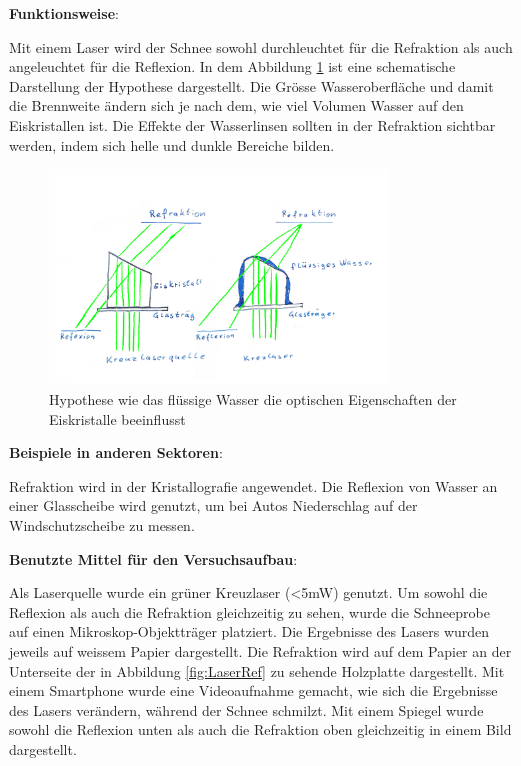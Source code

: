 

\textbf{Funktionsweise}:

Mit einem Laser wird der Schnee sowohl durchleuchtet für die Refraktion als auch angeleuchtet für die Reflexion. In dem Abbildung \ref{fig:LaserHypothese} ist eine schematische Darstellung der Hypothese dargestellt. Die Grösse Wasseroberfläche und damit die Brennweite ändern sich je nach dem, wie viel Volumen Wasser auf den Eiskristallen ist. Die Effekte der Wasserlinsen sollten in der Refraktion sichtbar werden, indem sich helle und dunkle Bereiche bilden.




\begin{figure}
    \centering
    \includegraphics[width=0.8\textwidth]{Bilder/Reflaktion.jpeg}
    \caption{Hypothese wie das flüssige Wasser die optischen Eigenschaften der Eiskristalle beeinflusst}
    \label{fig:LaserHypothese}
\end{figure}

\textbf{Beispiele in anderen Sektoren}:

Refraktion wird in der Kristallografie angewendet. Die Reflexion von Wasser an einer Glasscheibe wird genutzt, um bei Autos Niederschlag auf der Windschutzscheibe zu messen.


\textbf{Benutzte Mittel für den Versuchsaufbau}:

Als Laserquelle wurde ein grüner Kreuzlaser (<5mW) genutzt. Um sowohl die Reflexion als auch die Refraktion gleichzeitig zu sehen, wurde die Schneeprobe auf einen Mikroskop-Objektträger platziert. Die Ergebnisse des Lasers wurden jeweils auf weissem Papier dargestellt. Die Refraktion wird auf dem Papier an der Unterseite der in Abbildung \ref{fig:LaserRef} zu sehende Holzplatte dargestellt. Mit einem Smartphone wurde eine Videoaufnahme gemacht, wie sich die Ergebnisse des Lasers verändern, während der Schnee schmilzt. Mit einem Spiegel wurde sowohl die Reflexion unten als auch die Refraktion oben gleichzeitig in einem Bild dargestellt.



